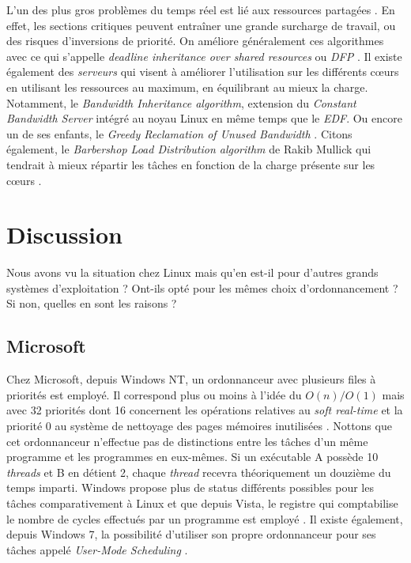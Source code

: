 \documentclass[letterpaper]{article}
\begin{document}
L'un des plus gros problèmes du temps réel est lié aux ressources partagées \citep{buttazzo2011hard}. En effet, les sections critiques peuvent entraîner une grande surcharge de travail, ou des risques d'inversions de priorité. On améliore généralement ces algorithmes avec ce qui s'appelle \textit{deadline inheritance over shared resources} ou \textit{DFP} \citep{jansen2003lightweight}. Il existe également des \textit{serveurs} qui visent à améliorer l'utilisation sur les différents cœurs en utilisant les ressources au maximum, en équilibrant au mieux la charge. Notamment, le \textit{Bandwidth Inheritance algorithm}, extension du \textit{Constant Bandwidth Server} \citep{Abeni:1998:IMA:827270.829047} intégré au noyau Linux en même temps que le \textit{EDF}. Ou encore un de ses enfants, le \textit{Greedy Reclamation of Unused Bandwidth} \citep{Lipari:2000:GRU:1947412.1947445}. Citons également, le \textit{Barbershop Load
Distribution algorithm} de Rakib Mullick qui tendrait à mieux répartir les tâches en fonction de la charge présente sur les cœurs \citep{BarbershopLoadDistribution}.

\section{Discussion}

Nous avons vu la situation chez Linux mais qu'en est-il pour d'autres grands systèmes d'exploitation ? Ont-ils opté pour les mêmes choix d'ordonnancement ? Si non, quelles en sont les raisons ?

\subsection{Microsoft}

Chez Microsoft, depuis Windows NT, un ordonnanceur avec plusieurs files à priorités est employé. Il correspond plus ou moins à l'idée du $O(n) / O(1)$ mais avec 32 priorités dont 16 concernent les opérations relatives au \textit{soft real-time} et la priorité 0 au système de nettoyage des pages mémoires inutilisées \citep{jones1999cpu}. Nottons que cet ordonnanceur n'effectue pas de distinctions entre les tâches d'un même programme et les programmes en eux-mêmes. Si un exécutable A possède 10 \textit{threads} et B en détient 2, chaque \textit{thread} recevra théoriquement un douzième du temps imparti. Windows propose plus de status différents possibles pour les tâches comparativement à Linux et que depuis Vista, le registre qui comptabilise le nombre de cycles effectués par un programme est employé \citep{Russinovich:2009:WII:1717352}. Il existe également, depuis Windows 7, la possibilité d'utiliser son propre ordonnanceur pour ses tâches appelé \textit{User-Mode Scheduling} \citep{UMS}.
\end{document}
